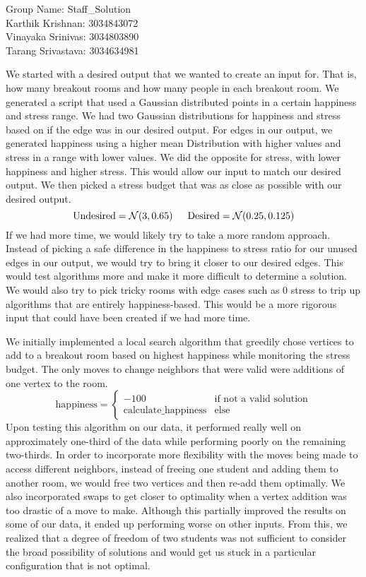 \documentclass[11pt]{article}
\begin{document}
    Group Name: Staff\_Solution \\
    Karthik Krishnan: 3034843072 \\
    Vinayaka Srinivas: 3034803890 \\
    Tarang Srivastava: 3034634981


    We started with a desired output that we wanted to create an input for. That is, how many breakout rooms and how many people in each breakout room. We generated a script that used a Gaussian distributed points in a certain happiness and stress range. We had two Gaussian distributions for happiness and stress based on if the edge was in our desired output. For edges in our output, we generated happiness using a higher mean Distribution with higher values and stress in a range with lower values. We did the opposite for stress, with lower happiness and higher stress. This would allow our input to match our desired output. We then picked a stress budget that was as close as possible with our desired output. 
    $$ \text{Undesired} = \mathcal{N}(3, 0.65) \indent \text{Desired} = \mathcal{N}(0.25, 0.125)$$
    If we had more time, we would likely try to take a more random approach. Instead of picking a safe difference in the happiness to stress ratio for our unused edges in our output, we would try to bring it closer to our desired edges. This would test algorithms more and make it more difficult to determine a solution. We would also try to pick tricky rooms with edge cases such as 0 stress to trip up algorithms that are entirely happiness-based. This would be a more rigorous input that could have been created if we had more time.


    We initially implemented a local search algorithm that greedily chose vertices to add to a breakout room based on highest happiness while monitoring the stress budget. 
    The only moves to change neighbors that were valid were additions of one vertex to the room. 
    $$ 
    \text{happiness} = 
    \begin{cases}
        -100 & \text{if not a valid solution} \\
        \text{calculate\_happiness} & \text{else}
    \end{cases}
    $$
    Upon testing this algorithm on our data, it performed really well on approximately one-third of the data while performing poorly on the remaining two-thirds. In order to incorporate more flexibility with the moves being made to access different neighbors, instead of freeing one student and adding them to another room, we would free two vertices and then re-add them optimally. We also incorporated swaps to get closer to optimality when a vertex addition was too drastic of a move to make. Although this partially improved the results on some of our data,  it ended up performing worse on other inputs. From this, we realized that a degree of freedom of two students was not sufficient to consider the broad possibility of solutions and would get us stuck in a particular configuration that is not optimal. 
\end{document}

